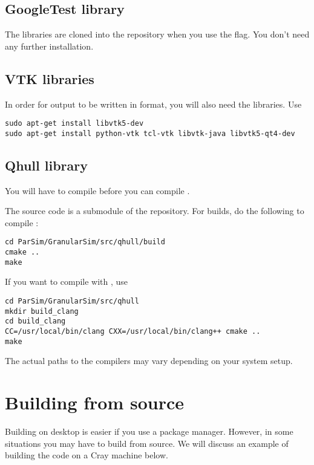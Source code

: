 \documentclass[11pt,fleqn]{book} %
\begin{document}
\subsection{GoogleTest library}
The  libraries are cloned into the repository when you use
the  flag.  You don't need any further installation.

\subsection{VTK libraries}
In order for output to be written in \VTK format, you will also need the  libraries. Use
\begin{lstlisting}[backgroundcolor=\color{background}]
sudo apt-get install libvtk5-dev
sudo apt-get install python-vtk tcl-vtk libvtk-java libvtk5-qt4-dev
\end{lstlisting}

\subsection{Qhull library}
\begin{WarningBox}
You will have to compile  before you can compile .
\end{WarningBox}

The  source code is a submodule of the repository.  For  builds,
do the following to compile :
\begin{lstlisting}[backgroundcolor=\color{background}]
cd ParSim/GranularSim/src/qhull/build
cmake ..
make
\end{lstlisting}
If you want to compile with , use
\begin{lstlisting}[backgroundcolor=\color{background}]
cd ParSim/GranularSim/src/qhull
mkdir build_clang
cd build_clang
CC=/usr/local/bin/clang CXX=/usr/local/bin/clang++ cmake ..
make
\end{lstlisting}
The actual paths to the  compilers may vary depending on your system setup.

\section{Building from source} \label{sec:build_from_src}
Building on desktop is easier if you use a package manager.  However, in some situations you may have to 
build from source.  We will discuss an example of building the code on a Cray machine below.
\end{document}
